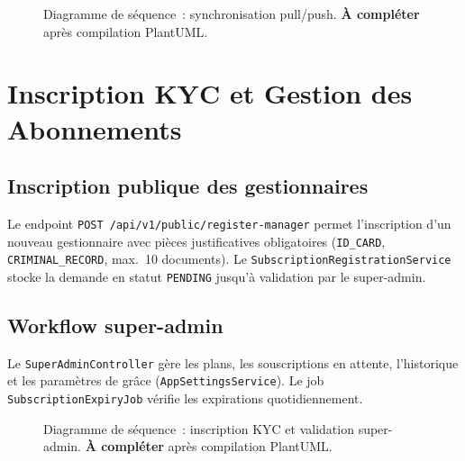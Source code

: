 \documentclass[12pt,a4paper]{report}
\begin{document}
\begin{enumerate}[leftmargin=2cm]
\begin{figure}[H]
  \centering
  \caption{Diagramme de séquence~: synchronisation pull/push.
           \textbf{À compléter} après compilation PlantUML.}
  \label{fig:seq_sync}
\end{figure}

\chapter{Inscription KYC et Gestion des Abonnements}

\section{Inscription publique des gestionnaires}

Le endpoint \texttt{POST /api/v1/public/register-manager} permet l'inscription
d'un nouveau gestionnaire avec pièces justificatives obligatoires
(\texttt{ID\_CARD}, \texttt{CRIMINAL\_RECORD}, max.\ 10 documents).
Le \texttt{SubscriptionRegistrationService} stocke la demande en statut
\texttt{PENDING} jusqu'à validation par le super-admin.

\section{Workflow super-admin}

Le \texttt{SuperAdminController} gère les plans, les souscriptions en attente,
l'historique et les paramètres de grâce (\texttt{AppSettingsService}).
Le job \texttt{SubscriptionExpiryJob} vérifie les expirations quotidiennement.

\begin{figure}[H]
  \centering
  \caption{Diagramme de séquence~: inscription KYC et validation super-admin.
           \textbf{À compléter} après compilation PlantUML.}
  \label{fig:seq_kyc}
\end{figure}


\end{enumerate}
\end{document}
